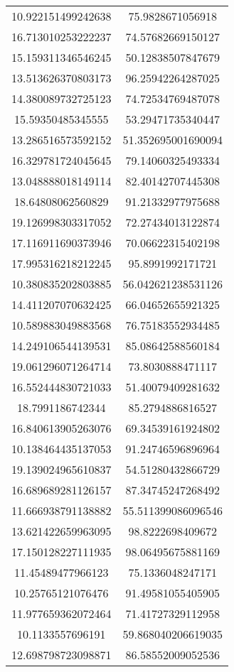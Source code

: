 \begin{table}
\begin{tabular}{cc}
10.922151499242638 & 75.9828671056918 \\
16.713010253222237 & 74.57682669150127 \\
15.159311346546245 & 50.12838507847679 \\
13.513626370803173 & 96.25942264287025 \\
14.380089732725123 & 74.72534769487078 \\
15.59350485345555 & 53.29471735340447 \\
13.286516573592152 & 51.352695001690094 \\
16.329781724045645 & 79.14060325493334 \\
13.048888018149114 & 82.40142707445308 \\
18.64808062560829 & 91.21332977975688 \\
19.126998303317052 & 72.27434013122874 \\
17.116911690373946 & 70.06622315402198 \\
17.995316218212245 & 95.8991992171721 \\
10.380835202803885 & 56.042621238531126 \\
14.411207070632425 & 66.04652655921325 \\
10.589883049883568 & 76.75183552934485 \\
14.249106544139531 & 85.08642588560184 \\
19.061296071264714 & 73.8030888471117 \\
16.552444830721033 & 51.40079409281632 \\
18.7991186742344 & 85.2794886816527 \\
16.840613905263076 & 69.34539161924802 \\
10.138464435137053 & 91.24746596896964 \\
19.139024965610837 & 54.51280432866729 \\
16.689689281126157 & 87.34745247268492 \\
11.666938791138882 & 55.511399086096546 \\
13.621422659963095 & 98.8222698409672 \\
17.150128227111935 & 98.06495675881169 \\
11.45489477966123 & 75.1336048247171 \\
10.25765121076476 & 91.49581055405905 \\
11.977659362072464 & 71.41727329112958 \\
10.1133557696191 & 59.868040206619035 \\
12.698798723098871 & 86.58552009052536 \\

\end{tabular}
\end{table}
